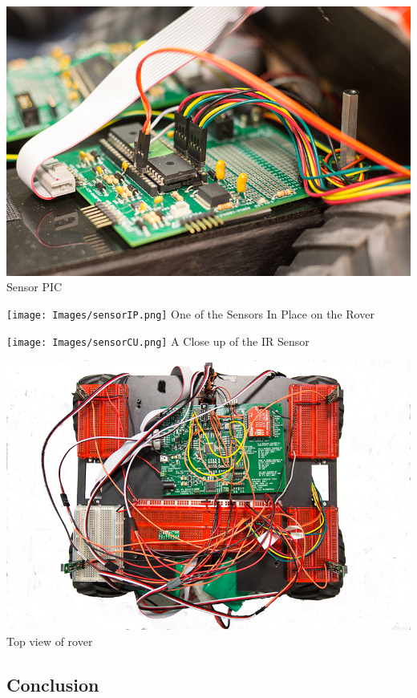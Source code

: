 \begin{center}
\includegraphics[scale=0.35]{Images/sensor.png}
Sensor PIC
\end{center}
\begin{center}
\texttt{[image: Images/sensorIP.png]}
One of the Sensors In Place on the Rover
\end{center}
\begin{center}
\texttt{[image: Images/sensorCU.png]}
A Close up of the IR Sensor
\end{center}
\begin{center}
\includegraphics[scale=0.35]{Images/rover.png}
Top view of rover
\end{center}

\subsection{Conclusion}


